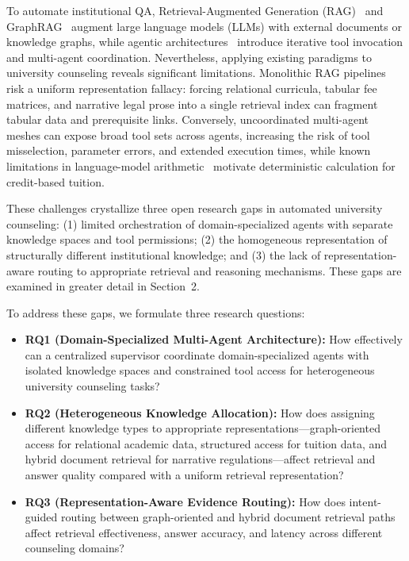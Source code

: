 To automate institutional QA, Retrieval-Augmented Generation (RAG)~\cite{lewis2020rag,gao2023rag_survey} and GraphRAG~\cite{edge2024graphrag} augment large language models (LLMs) with external documents or knowledge graphs, while agentic architectures~\cite{yao2023react,wu2023autogen,schick2023toolformer} introduce iterative tool invocation and multi-agent coordination. Nevertheless, applying existing paradigms to university counseling reveals significant limitations. Monolithic RAG pipelines risk a uniform representation fallacy: forcing relational curricula, tabular fee matrices, and narrative legal prose into a single retrieval index can fragment tabular data and prerequisite links. Conversely, uncoordinated multi-agent meshes can expose broad tool sets across agents, increasing the risk of tool misselection, parameter errors, and extended execution times, while known limitations in language-model arithmetic~\cite{qian2023limitations} motivate deterministic calculation for credit-based tuition.

These challenges crystallize three open research gaps in automated university counseling: (1) limited orchestration of domain-specialized agents with separate knowledge spaces and tool permissions; (2) the homogeneous representation of structurally different institutional knowledge; and (3) the lack of representation-aware routing to appropriate retrieval and reasoning mechanisms. These gaps are examined in greater detail in Section~2.

To address these gaps, we formulate three research questions:
\begin{itemize}
    \setlength{\itemsep}{1.5pt}
    \setlength{\parsep}{0pt}
    \setlength{\parskip}{0pt}

    \item \textbf{RQ1 (Domain-Specialized Multi-Agent Architecture):}
    How effectively can a centralized supervisor coordinate domain-specialized agents with isolated knowledge spaces and constrained tool access for heterogeneous university counseling tasks?

    \item \textbf{RQ2 (Heterogeneous Knowledge Allocation):}
    How does assigning different knowledge types to appropriate representations---graph-oriented access for relational academic data, structured access for tuition data, and hybrid document retrieval for narrative regulations---affect retrieval and answer quality compared with a uniform retrieval representation?

    \item \textbf{RQ3 (Representation-Aware Evidence Routing):}
    How does intent-guided routing between graph-oriented and hybrid document retrieval paths affect retrieval effectiveness, answer accuracy, and latency across different counseling domains?
\end{itemize}

